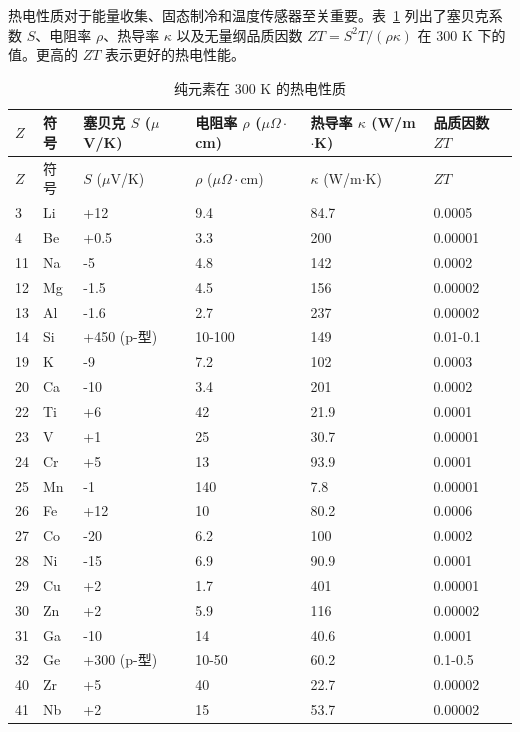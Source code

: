 \documentclass[12pt,a4paper]{article}
\begin{document}
	热电性质对于能量收集、固态制冷和温度传感器至关重要。表~\ref{tab:thermoelectric-properties-func} 列出了塞贝克系数 \(S\)、电阻率 \(\rho\)、热导率 \(\kappa\) 以及无量纲品质因数 \(ZT = S^2 T / (\rho \kappa)\) 在 300 K 下的值。更高的 \(ZT\) 表示更好的热电性能。
	
	\begin{longtable}{p{0.8cm}p{1.2cm}p{2.2cm}p{2.2cm}p{2.2cm}p{2.2cm}}
		\caption{纯元素在 300 K 的热电性质} \label{tab:thermoelectric-properties-func} \\
		\toprule
		\(Z\) & 符号 & 塞贝克 \(S\) (\(\mu\)V/K) & 电阻率 \(\rho\) (\(\mu\Omega\cdot\)cm) & 热导率 \(\kappa\) (W/m\(\cdot\)K) & 品质因数 \(ZT\) \\
		\midrule
		\endfirsthead
		\toprule
		\(Z\) & 符号 & \(S\) (\(\mu\)V/K) & \(\rho\) (\(\mu\Omega\cdot\)cm) & \(\kappa\) (W/m\(\cdot\)K) & \(ZT\) \\
		\midrule
		\endhead
		3  & Li & +12 & 9.4 & 84.7 & 0.0005 \\
		4  & Be & +0.5 & 3.3 & 200 & 0.00001 \\
		11 & Na & -5 & 4.8 & 142 & 0.0002 \\
		12 & Mg & -1.5 & 4.5 & 156 & 0.00002 \\
		13 & Al & -1.6 & 2.7 & 237 & 0.00002 \\
		14 & Si & +450 (p-型) & 10-100 & 149 & 0.01-0.1 \\
		19 & K  & -9 & 7.2 & 102 & 0.0003 \\
		20 & Ca & -10 & 3.4 & 201 & 0.0002 \\
		22 & Ti & +6 & 42 & 21.9 & 0.0001 \\
		23 & V  & +1 & 25 & 30.7 & 0.00001 \\
		24 & Cr & +5 & 13 & 93.9 & 0.0001 \\
		25 & Mn & -1 & 140 & 7.8 & 0.00001 \\
		26 & Fe & +12 & 10 & 80.2 & 0.0006 \\
		27 & Co & -20 & 6.2 & 100 & 0.0002 \\
		28 & Ni & -15 & 6.9 & 90.9 & 0.0001 \\
		29 & Cu & +2 & 1.7 & 401 & 0.00001 \\
		30 & Zn & +2 & 5.9 & 116 & 0.00002 \\
		31 & Ga & -10 & 14 & 40.6 & 0.0001 \\
		32 & Ge & +300 (p-型) & 10-50 & 60.2 & 0.1-0.5 \\
		40 & Zr & +5 & 40 & 22.7 & 0.00002 \\
		41 & Nb & +2 & 15 & 53.7 & 0.00002 \\

\end{longtable}
\end{document}
